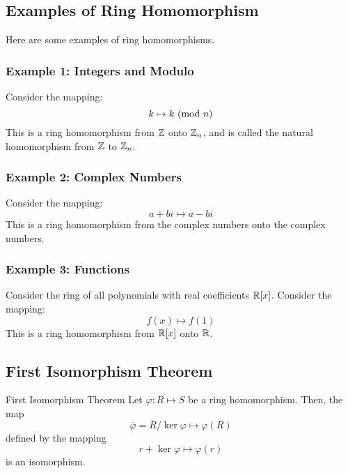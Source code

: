 \documentclass[letterpaper]{article}
\begin{document}
\subsection{Examples of Ring Homomorphism}
Here are some examples of ring homomorphisms.

\subsubsection{Example 1: Integers and Modulo}
Consider the mapping: 
\[k \mapsto k \ (\mathrm{mod}\ n)\]
This is a ring homomorphism from $\mathbb{Z}$ onto $\mathbb{Z}_{n}$, and is called the natural homomorphism from $\mathbb{Z}$ to $\mathbb{Z}_{n}$. 

\subsubsection{Example 2: Complex Numbers}
Consider the mapping: 
\[a + bi \mapsto a - bi\]
This is a ring homomorphism from the complex numbers onto the complex numbers. 

\subsubsection{Example 3: Functions}
Consider the ring of all polynomials with real coefficients $\mathbb{R}[x]$. Consider the mapping:
\[f(x) \mapsto f(1)\]
This is a ring homomorphism from $\mathbb{R}[x]$ onto $\mathbb{R}$. 


\subsection{First Isomorphism Theorem}
\begin{theorem}{First Isomorphism Theorem}{}
    Let $\varphi: R \mapsto S$ be a ring homomorphism. Then, the map
    \[\overline{\varphi} = R / \ker\varphi \mapsto \varphi(R)\]
    defined by the mapping
    \[r + \ker\varphi \mapsto \varphi(r)\]
    is an isomorphism.
\end{theorem}
\end{document}
